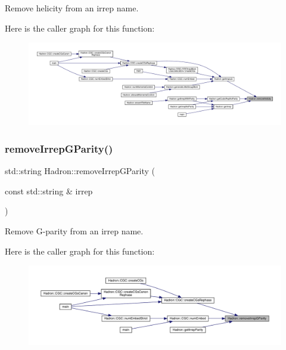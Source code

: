 Remove helicity from an irrep name. 

Here is the caller graph for this function\+:
\nopagebreak
\begin{figure}[H]
\begin{center}
\leavevmode
\includegraphics[width=350pt]{d1/daf/namespaceHadron_a877ae1e797f5cf4d4ebb7e22d5bbe69b_icgraph}
\end{center}
\end{figure}
\mbox{\label{namespaceHadron_a6c2109897dff664c15b3fe81aa7d8917}} 
\subsubsection{\texorpdfstring{removeIrrepGParity()}{removeIrrepGParity()}}
{\footnotesize\ttfamily std\+::string Hadron\+::remove\+Irrep\+G\+Parity (\begin{DoxyParamCaption}\item[{const std\+::string \&}]{irrep }\end{DoxyParamCaption})}



Remove G-\/parity from an irrep name. 

Here is the caller graph for this function\+:\nopagebreak
\begin{figure}[H]
\begin{center}
\leavevmode
\includegraphics[width=350pt]{d1/daf/namespaceHadron_a6c2109897dff664c15b3fe81aa7d8917_icgraph}
\end{center}
\end{figure}
\mbox{\label{namespaceHadron_aff55b5fd81ffee95432b7d4e1c8d01e6}} 
